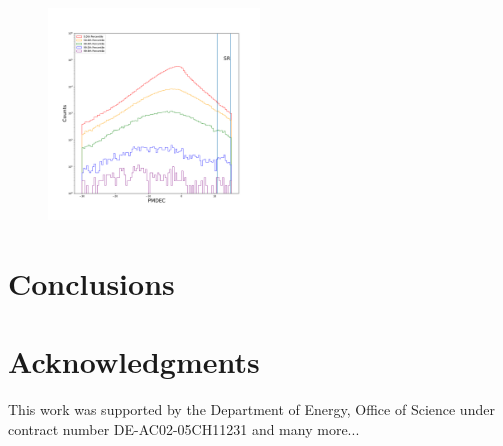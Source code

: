 \documentclass[12pt,prd]{article}
\begin{document}
\begin{figure}[h!]
\includegraphics[width=0.5\textwidth]{../figures/scanning_plotsgaiascan_l99_0_b50_2_ra224_7_dec60_6_npy.pdf}
\end{figure}

\section{Conclusions} \label{sec:conclusions}


\section*{\label{sec::acknowledgments}Acknowledgments}

This work was supported by the Department of Energy, Office of Science under contract number DE-AC02-05CH11231 and many more...



\end{document}
